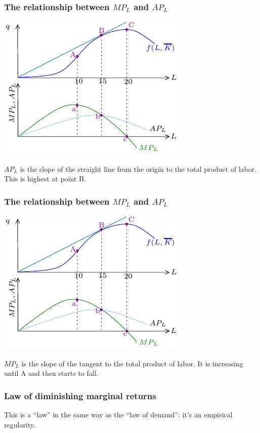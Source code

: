 \documentclass[xcolor=pdftex,dvipsnames]{beamer}
\begin{document}
\begin{frame}
\frametitle{The relationship between $MP_L$ and $AP_L$}
\begin{center}\includegraphics{pics/MPAP}\end{center}
$AP_L$ is the slope of the straight line from the origin to the total
product of labor. This is highest at point B.
\end{frame}


\begin{frame}
\frametitle{The relationship between $MP_L$ and $AP_L$}
\begin{center}\includegraphics{pics/MPAP}\end{center}
$MP_L$ is the slope of the tangent to the total
product of labor. It is increasing until A and then starts to fall.
\end{frame}




\begin{frame}
\frametitle{Law of diminishing marginal returns}
This is a ``law'' in the same way as the ``law of demand'': it's an
empirical regularity.

\bigskip
{}

\bigskip
{}

\bigskip
{}

\end{frame}
\end{document}
